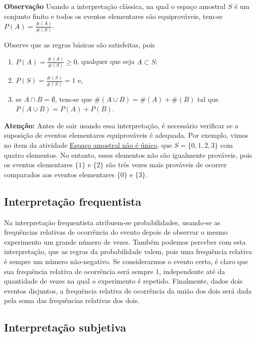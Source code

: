 \begin{observation}{ }

\textbf{Observação} Usando a interpretação clássica, na qual o espaço amostral \(S\) é um conjunto finito e todos os eventos elementares são equiprováveis, tem-se \(P(A)=\frac{\#(A)}{\#(S)}\).

Observe que as regras básicas são satisfeitas, pois
\begin{enumerate}
\item {} 
\(P(A)=\displaystyle{\frac{\#(A)}{\#(S)}}\geq 0\), qualquer que seja \(A \subset S\);

\item {} 
\(P(S)=\displaystyle{\frac{\#(S)}{\#(S)}=1}\) e,

\item {} 
se \(A\cap B=\emptyset\), tem-se que \(\#(A\cup B)=\#(A)+\#(B)\) tal que \(P(A\cup B)=P(A)+P(B)\).

\end{enumerate}

\textbf{Atenção:} Antes de sair usando essa interpretação, é necessário verificar se a suposição de eventos elementares equiprováveis é adequada. Por exemplo, vimos no item  da atividade \hyperref[espaço-nao-unico]{Espaço amostral não é único}, que \(S=\{0,1,2,3\}\) com quatro elementos. No entanto, esses elementos não são igualmente prováveis, pois os eventos elementares \(\{1\}\) e \(\{ 2\}\) são três vezes mais prováveis de ocorrer comparados aos eventos elementares \(\{0\}\) e \(\{3\}\).
\end{observation}

\subsection{Interpretação frequentista}

Na interpretação frequentista atribuem-se probabilidades, usando-se as frequências relativas de ocorrência do evento depois de observar o mesmo experimento um grande número de vezes. Também podemos perceber com esta interpretação, que as regras da probabilidade valem, pois uma frequência relativa é sempre um número não-negativo. Se considerarmos o evento certo, é claro que sua frequência relativa de ocorrência será sempre 1, independente até da quantidade de vezes na qual o experimento é repetido. Finalmente, dados dois eventos disjuntos, a frequência relativa de ocorrência da união dos dois será dada pela soma das frequências relativas dos dois.

\subsection{Interpretação subjetiva}

